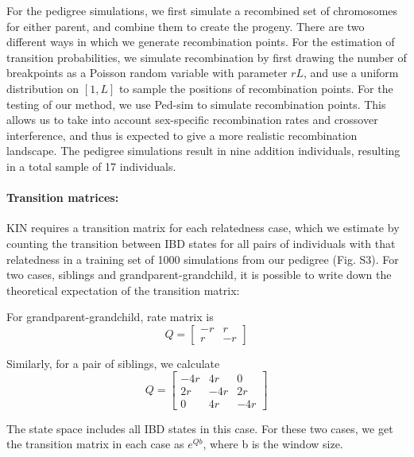 \documentclass[12pt, letterpaper]{article}
\begin{document}
For the pedigree simulations, we first simulate a recombined set of chromosomes for either parent, and combine them to create the progeny. There are two different ways in which we generate recombination points. For the estimation of transition probabilities, we simulate recombination by first drawing the number of breakpoints as a Poisson random variable with parameter $rL$, and use a uniform distribution on $[1, L]$ to sample the positions of recombination points. For the testing of our method, we use Ped-sim \cite{caballero_crossover_2019} to simulate recombination points. This allows us to take into account sex-specific recombination rates and crossover interference, and thus is expected to give a more realistic recombination landscape. The pedigree simulations result in nine addition individuals, resulting in a total sample of 17 individuals.

\paragraph{Transition matrices:}
KIN requires a transition matrix for each relatedness case, which we estimate by counting the transition between IBD states for all pairs of individuals with that relatedness in a training set of 1000 simulations from our pedigree (Fig. S3). For two cases, siblings and grandparent-grandchild, it is possible to write down the theoretical expectation of the transition matrix:

For grandparent-grandchild, rate matrix is
 $$Q = \left[\begin{array}
{rrr}
-r & r \\
r & -r
\end{array}\right]$$

Similarly, for a pair of siblings, we calculate $$Q =
\left[\begin{array}
{rrr}
-4r & 4r & 0\\
2r & -4r & 2r\\
0 & 4r & -4r
\end{array}\right]$$

The state space includes all IBD states in this case. For these two cases, we get the transition matrix in each case as $e^{Qb}$, where b is the window size.
\end{document}
